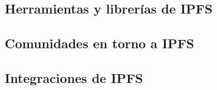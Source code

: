 \subsection{Herramientas y librerías de IPFS}
\subsection{Comunidades en torno a IPFS}
\subsection{Integraciones de IPFS}
